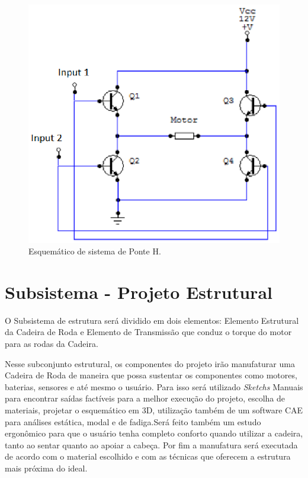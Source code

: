 \begin{figure}[H]
  \centering
    \includegraphics[width=\textwidth]{figuras/ponte_h.eps}
  \caption{Esquemático de sistema de Ponte H.}
  \label{fig:ponte_h}
\end{figure}

\section{Subsistema - Projeto Estrutural}
O Subsistema de estrutura será dividido em dois elementos: 
Elemento Estrutural da Cadeira de Roda e Elemento de Transmissão 
que conduz o torque do motor para as rodas da Cadeira.

Nesse subconjunto estrutural, os componentes do projeto irão 
manufaturar uma Cadeira de Roda de maneira que possa sustentar 
os componentes como motores, baterias, sensores e até mesmo o 
usuário. Para isso será utilizado \textit{Sketchs} Manuais 
para encontrar saídas factíveis para a melhor execução do projeto, 
escolha de materiais, projetar o esquemático em 3D, 
utilização também de um software CAE para análises estática, 
modal e de fadiga.Será feito também um estudo ergonômico 
para que o usuário tenha completo conforto quando utilizar a 
cadeira, tanto ao sentar quanto ao apoiar a cabeça. Por fim a 
manufatura será executada de acordo com o material escolhido 
e com as técnicas que oferecem a estrutura mais próxima do ideal.

